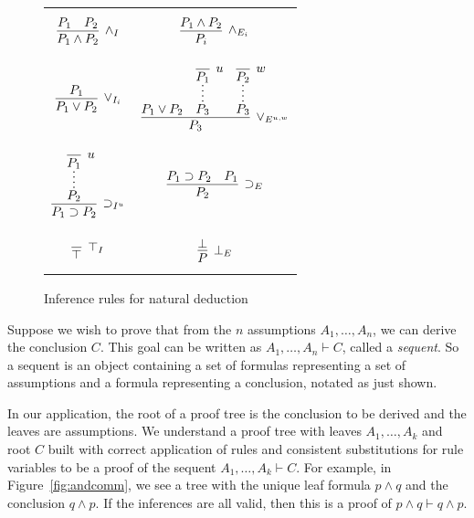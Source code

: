\documentclass[journal]{vgtc}                %
\begin{document}
\begin{figure}

\begin{center}
\begin{tabu} to 0.5\textwidth { X[c,b] X[c,b] }

$$
\infer[\wedge_I]{P_1 \wedge P_2}{P_1 & P_2}
$$

&

$$
\infer[\wedge_{E_i}]{P_i}{P_1 \wedge P_2}
$$

\\

$$
\infer[\vee_{I_i}]{P_1 \vee P_2}{P_1}
$$

&

$$
\infer[\vee_{E^{u,w}}]{P_3}{P_1 \vee P_2 &
    \infer*{P_3}{\infer[u]{P_1}{}} &
    \infer*{P_3}{\infer[w]{P_2}{}}}
$$

\\

$$
\infer[\supset_{I^u}]{P_1 \supset P_2}{\infer*{P_2}{\infer[u]{P_1}{}}}
$$

&

$$
\infer[\supset_E]{P_2}{P_1 \supset P_2 & P_1}
$$

\\[-20pt]

$$
\infer[\top_I]{\top}{}
$$

&

$$
\infer[\bot_E]{P}{\bot}
$$

\end{tabu}
\end{center}

\caption{Inference rules for natural deduction}
\label{fig:natdedrules}
\end{figure}


Suppose we wish to prove that from the $n$ assumptions $A_1, \dots , A_n$, we can derive the conclusion $C$. This goal can be written as $A_1, \dots, A_n \vdash C$, called a \textit{sequent}. So a sequent is an object containing a set of formulas representing a set of assumptions and a formula representing a conclusion, notated as just shown.

In our application, the root of a proof tree is the conclusion to be derived and the leaves are assumptions. We understand a proof tree with leaves $A_1, \dots, A_k$ and root $C$ built with correct application of rules and consistent substitutions for rule variables to be a proof of the sequent $A_1, \dots, A_k \vdash C$. For example, in Figure~\ref{fig:andcomm}, we see a tree with the unique leaf formula $p \wedge q$ and the conclusion $q \wedge p$. If the inferences are all valid, then this is a proof of $p \wedge q \vdash q \wedge p$.
\end{document}
